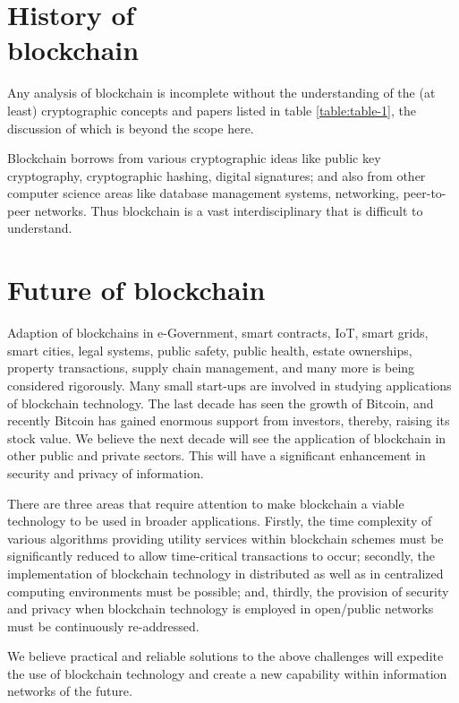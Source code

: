 \documentclass[12pt]{article}
\begin{document}
\begin{multicols}{2}

\section{History of \\blockchain}
Any analysis of blockchain is incomplete without the understanding of the (at least) cryptographic concepts and papers listed in table \ref{table:table-1}, the discussion of which is beyond the scope here.\par

Blockchain borrows from various cryptographic ideas like public key cryptography, cryptographic hashing, digital signatures; and also from other computer science areas like database management systems, networking, peer-to-peer networks. Thus blockchain is a vast interdisciplinary that is difficult to understand.

\section{Future of blockchain}
Adaption of blockchains in e-Government, smart contracts, IoT, smart grids, smart cities, legal systems, public safety, public health, estate ownerships, property transactions, supply chain management, and many more is being considered rigorously. Many small start-ups are involved in studying applications of blockchain technology. The last decade has seen the growth of Bitcoin, and recently Bitcoin has gained enormous support from investors, thereby, raising its stock value. We believe the next decade will see the application of blockchain in other public and private sectors. This will have a significant enhancement in security and privacy of information.\cite{ieee}\par

There are three areas that require attention to make blockchain a viable technology to be used in broader applications. Firstly, the time complexity of various algorithms providing utility services within blockchain schemes must be significantly reduced to allow time-critical transactions to occur; secondly, the implementation of blockchain technology in distributed as well as in centralized computing environments must be possible; and, thirdly, the provision of security and privacy when blockchain technology is employed in open/public networks must be continuously re-addressed.\cite{ieee}\par

We believe practical and reliable solutions to the above challenges will expedite the use of blockchain technology and create a new capability within information networks of the future.\cite{ieee}
\end{multicols}
\end{document}
